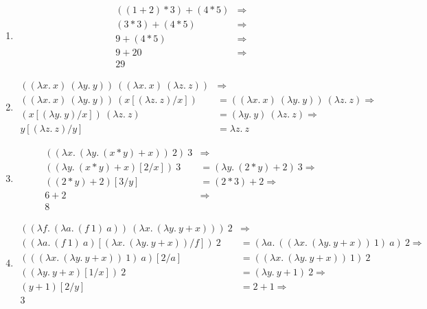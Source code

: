 \documentclass[12pt]{article}
\begin{document}
\begin{enumerate}[label=\alph*)]
  \vfill

  \item
    \begin{align}
      ((1 + 2) * 3) + (4 * 5) &\Rightarrow \tag{AddL MultL Add}\\
      (3 * 3) + (4 * 5) &\Rightarrow \tag{AddL Mult}\\
      9 + (4 * 5) &\Rightarrow \tag{AddR Mult}\\
      9 + 20 &\Rightarrow \tag{Add}\\
      29\nonumber
    \end{align}

  \vfill

  \item
    \begin{align}
      ((\lambda x.\ x)\ (\lambda y.\ y))\ ((\lambda x.\ x)\ (\lambda z.\ z)) &\Rightarrow \tag{AppR Beta}\\
      ((\lambda x.\ x)\ (\lambda y.\ y))\ (x[(\lambda z.\ z)/x]) &= ((\lambda x.\ x)\ (\lambda y.\ y))\ (\lambda z.\ z) \Rightarrow \tag{AppL Beta}\\
      (x[(\lambda y.\ y)/x])\ (\lambda z.\ z) &= (\lambda y.\ y)\ (\lambda z.\ z) \Rightarrow \tag{Beta}\\
      y[(\lambda z.\ z)/y] &= \lambda z.\ z\nonumber
    \end{align}

  \vfill

  \item
    \begin{align}
      ((\lambda x.\ (\lambda y.\ (x * y) + x))\ 2)\ 3 &\Rightarrow \tag{AppL Beta}\\
      ((\lambda y.\ (x * y) + x)[2/x])\ 3 &= (\lambda y.\ (2 * y) + 2)\ 3 \Rightarrow \tag{Beta} \\
      ((2 * y) + 2)[3/y] &= (2 * 3) + 2 \Rightarrow \tag{AddL Mult}\\
      6 + 2 &\Rightarrow \tag{Add}\\
      8\nonumber
    \end{align}

  \vfill

  \item
    \begin{align}
      ((\lambda f.\ (\lambda a.\ (f\ 1)\ a))\ (\lambda x.\ (\lambda y.\ y + x)))\ 2 &\Rightarrow \tag{AppL Beta}\\
      ((\lambda a.\ (f\ 1)\ a)[(\lambda x.\ (\lambda y.\ y + x))/f])\ 2 &= (\lambda a.\ ((\lambda x.\ (\lambda y.\ y + x))\ 1)\ a)\ 2 \Rightarrow \tag{Beta}\\
      (((\lambda x.\ (\lambda y.\ y + x))\ 1)\ a)[2/a] &= ((\lambda x.\ (\lambda y.\ y + x))\ 1)\ 2 \tag{AppL Beta}\\
      ((\lambda y.\ y + x)[1/x])\ 2 &= (\lambda y.\ y + 1)\ 2 \Rightarrow \tag{Beta}\\
      (y + 1)[2/y] &= 2 + 1 \Rightarrow \tag{Add}\\
      3\nonumber
    \end{align}

  \vfill
\end{enumerate}
\end{document}
